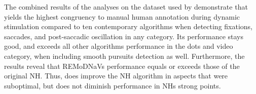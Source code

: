 %
%

    The combined results of the analyses on the dataset used by \citet{Andersson2017} demonstrate that \remodnav yields
    the highest congruency to manual human annotation during dynamic stimulation compared to ten contemporary
    algorithms when detecting fixations, saccades, and post-saccadic oscillation in any category. Its performance
    stays good, and exceeds all other algorithms performance in the dots and video category, when including smooth
    pursuits detection as well. Furthermore, the results reveal that REMoDNaVs performance equals or exceeds those of
    the original NH. Thus, \remodnav does improve the NH algorithm in aspects that were suboptimal, but does not
    diminish performance in NHs strong points.


